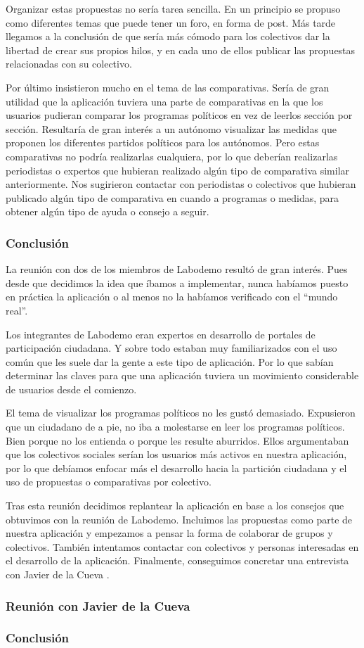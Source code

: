 Organizar estas propuestas no sería tarea sencilla. En un principio se propuso como diferentes temas que puede tener un foro, en forma de post. Más tarde llegamos a la conclusión de que sería más cómodo para los colectivos dar la libertad de crear sus propios hilos, y en cada uno de ellos publicar las propuestas relacionadas con su colectivo.

Por último insistieron mucho en el tema de las comparativas. Sería de gran utilidad que la aplicación tuviera una parte de comparativas en la que los usuarios pudieran comparar los programas políticos en vez de leerlos sección por sección. Resultaría de gran interés a un autónomo visualizar las medidas que proponen los diferentes partidos políticos para los autónomos. Pero estas comparativas no podría realizarlas cualquiera, por lo que deberían realizarlas periodistas o expertos que hubieran realizado algún tipo de comparativa similar anteriormente. Nos sugirieron contactar con periodistas o colectivos que hubieran publicado algún tipo de comparativa en cuando a programas o medidas, para obtener algún tipo de ayuda o consejo a seguir.

\subsubsection{Conclusión}

La reunión con dos de los miembros de Labodemo resultó de gran interés. Pues desde que decidimos la idea que íbamos a implementar, nunca habíamos puesto en práctica la aplicación o al menos no la habíamos verificado con el “mundo real”.

Los integrantes de Labodemo eran expertos en desarrollo de portales de participación ciudadana. Y sobre todo estaban muy familiarizados con el uso común que les suele dar la gente a este tipo de aplicación. Por lo que sabían determinar las claves para que una aplicación tuviera un movimiento considerable de usuarios desde el comienzo.

El tema de visualizar los programas políticos no les gustó demasiado. Expusieron que un ciudadano de a pie, no iba a molestarse en leer los programas políticos. Bien porque no los entienda o porque les resulte aburridos. Ellos argumentaban que los colectivos sociales serían los usuarios más activos en nuestra aplicación, por lo que debíamos enfocar más el desarrollo hacia la partición ciudadana y el uso de propuestas o comparativas por colectivo.

Tras esta reunión decidimos replantear la aplicación en base a los consejos que obtuvimos con la reunión de Labodemo. Incluimos las propuestas como parte de nuestra aplicación y empezamos a pensar la forma de colaborar de grupos y colectivos. También intentamos contactar con colectivos y personas interesadas en el desarrollo de la aplicación. Finalmente, conseguimos concretar una entrevista con Javier de la Cueva \cite{ref:jdelacueva}.

\subsubsection{Reunión con Javier de la Cueva}

\subsubsection{Conclusión}